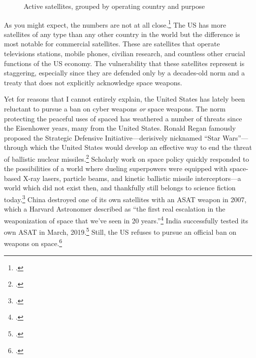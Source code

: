 \documentclass[11pt]{memoir}
\begin{document}
\begin{figure}[ht]
	\small
	\centering
	
	\label{country_sats}
	\caption{Active satellites, grouped by operating country and purpose}
\end{figure}

As you might expect, the numbers are not at all close.\footcite[A few satellites are listed as dual-purpose (i.e. Government/Military), and those are counted twice, once for each purpose. For instance, the data shows that the US is currently operating 830 satellites, while adding up the bars in this chart would give you 966. I made this choice to emphasize the dependency of various social systems on the existing satellite infrastructure.]{union_of_concerned_scientists_ucs_2018} The US has more satellites of any type than any other country in the world but the difference is most notable for commercial satellites. These are satellites that operate televisions stations, mobile phones, civilian research, and countless other crucial functions of the US economy. The vulnerability that these satellites represent is staggering, especially since they are defended only by a decades-old norm and a treaty that does not explicitly acknowledge space weapons.

Yet for reasons that I cannot entirely explain, the United States has lately been reluctant to pursue a ban on cyber weapons \emph{or} space weapons. The norm protecting the peaceful uses of spaced has weathered a number of threats since the Eisenhower years, many from the United States. Ronald Regan famously proposed the Strategic Defensive Initiative---derisively nicknamed ``Star Wars''---through which the United States would develop an effective way to end the threat of ballistic nuclear missiles.\footcite{reagan_address_1983} Scholarly work on space policy quickly responded to the possibilities of a world where dueling superpowers were equipped with space-based X-ray lasers, particle beams, and kinetic ballistic missile interceptors---a world which did not exist then, and thankfully still belongs to science fiction today.\footcite[p.~1-2]{moorhead_work_2013} China destroyed one of its own satellites with an ASAT weapon in 2007, which a Harvard Astronomer described as ``the first real escalation in the weaponization of space that we’ve seen in 20 years.''\footcite{broad_china_2007} India successfully tested its own ASAT in March, 2019.\footcite{gettleman_india_2019} Still, the US refuses to pursue an official ban on weapons on space.\footcite{oconnor_u.s._2019}
\end{document}
